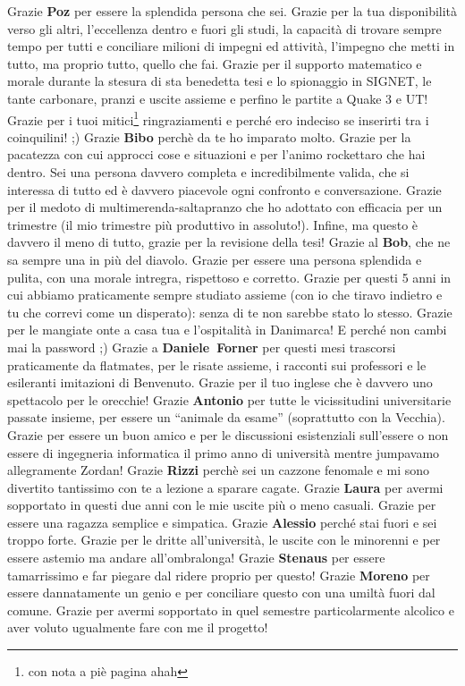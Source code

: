 \documentclass[10pt]{amsart}
\newcommand{\n}[1]{{\Large \bf #1}}
\begin{document}
Grazie \n{Poz} per essere la splendida persona che sei. Grazie per la tua disponibilità verso gli altri, l'eccellenza dentro e fuori gli studi, la capacità di trovare sempre tempo per tutti e conciliare milioni di impegni ed attività, l'impegno che metti in tutto, ma proprio tutto, quello che fai. Grazie per il supporto matematico e morale durante la stesura di sta benedetta tesi e lo spionaggio in SIGNET, le tante carbonare, pranzi e uscite assieme e perfino le partite a Quake 3 e UT!  Grazie per i tuoi mitici\footnote{con nota a piè pagina ahah} ringraziamenti e perché ero indeciso se inserirti tra i coinquilini! ;)
Grazie \n{Bibo} perchè da te ho imparato molto. Grazie per la pacatezza con cui approcci cose e situazioni e per l'animo rockettaro che hai dentro. Sei una persona davvero completa e incredibilmente valida, che si interessa di tutto ed è davvero piacevole ogni confronto e conversazione. Grazie per il medoto di multimerenda-saltapranzo che ho adottato con efficacia per un trimestre (il mio trimestre più produttivo in assoluto!). Infine, ma questo è davvero il meno di tutto, grazie per la revisione della tesi!
Grazie al \n{Bob}, che ne sa sempre una in più del diavolo. Grazie per essere una persona splendida e pulita, con una morale intregra, rispettoso e corretto. Grazie per questi 5 anni in cui abbiamo praticamente sempre studiato assieme (con io che tiravo indietro e tu che correvi come un disperato): senza di te non sarebbe stato lo stesso. Grazie per le mangiate onte a casa tua e l'ospitalità in Danimarca! E perché non cambi mai la password ;)
Grazie a \mbox{\n{Daniele Forner}} per questi mesi trascorsi praticamente da flatmates, per le risate assieme, i racconti sui professori e le esileranti imitazioni di Benvenuto. Grazie per il tuo inglese che è davvero uno spettacolo per le orecchie!
Grazie \n{Antonio} per tutte le vicissitudini universitarie passate insieme, per essere un ``animale da esame'' (soprattutto con la Vecchia). Grazie per essere un buon amico e per le discussioni esistenziali sull'essere o non essere di ingegneria informatica il primo anno di università mentre jumpavamo allegramente Zordan! Grazie \n{Rizzi} perchè sei un cazzone fenomale e mi sono divertito tantissimo con te a lezione a sparare cagate. Grazie \n{Laura} per avermi sopportato in questi due anni con le mie uscite più o meno casuali. Grazie per essere una ragazza semplice e simpatica. Grazie \n{Alessio} perché stai fuori e sei troppo forte. Grazie per le dritte all'università, le uscite con le minorenni e per essere astemio ma andare all'ombralonga! Grazie \n{Stenaus} per essere tamarrissimo e far piegare dal ridere proprio per questo! Grazie \n{Moreno} per essere dannatamente un genio e per conciliare questo con una umiltà fuori dal comune. Grazie per avermi sopportato in quel semestre particolarmente alcolico e aver voluto ugualmente fare con me il progetto!\\
\end{document}
